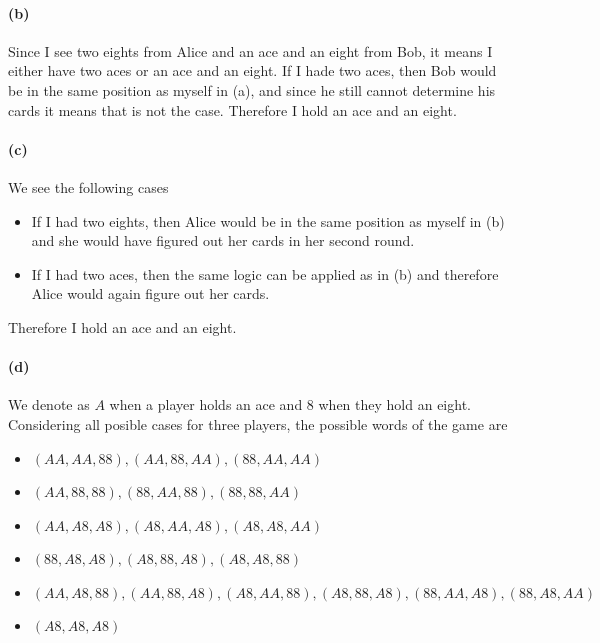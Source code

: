 \documentclass[a4paper,11pt]{article}
\begin{document}
\paragraph{(b)} Since I see two eights from Alice and an ace and an eight from Bob, it means I either have two aces or an ace and an eight.
If I hade two aces, then Bob would be in the same position as myself in (a), and since he still cannot determine his cards it means that is not the case.
Therefore I hold an ace and an eight.

\paragraph{(c)} We see the following cases
\begin{itemize}
	\item If I had two eights, then Alice would be in the same position as myself in (b) and she would have figured out her cards in her second round.
	\item If I had two aces, then the same logic can be applied as in (b) and therefore Alice would again figure out her cards.
\end{itemize}
Therefore I hold an ace and an eight.

\paragraph{(d)} We denote as $A$ when a player holds an ace and $8$ when they hold an eight.
Considering all posible cases for three players, the possible words of the game are
\begin{itemize}
	\item $(AA,AA,88),(AA,88,AA),(88,AA,AA)$
	\item $(AA,88,88),(88,AA,88),(88,88,AA)$
	\item $(AA,A8,A8),(A8,AA,A8),(A8,A8,AA)$
	\item $(88,A8,A8),(A8,88,A8),(A8,A8,88)$
	\item $(AA,A8,88),(AA,88,A8),(A8,AA,88),(A8,88,A8),(88,AA,A8),(88,A8,AA)$
	\item $(A8,A8,A8)$
\end{itemize}
\end{document}
